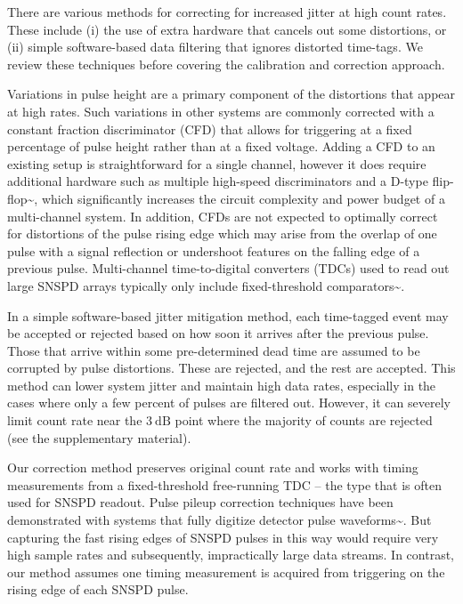 \documentclass[11pt]{caltech_thesis} %
\begin{document}
There are various methods for correcting for increased jitter at high
count rates. These include (i) the use of extra hardware that cancels
out some distortions, or (ii) simple software-based data filtering that
ignores distorted time-tags. We review these techniques before covering
the calibration and correction approach.

Variations in pulse height are a primary component of the distortions
that appear at high rates. Such variations in other systems are commonly
corrected with a constant fraction discriminator (CFD) that allows for
triggering at a fixed percentage of pulse height rather than at a fixed
voltage. Adding a CFD to an existing setup is straightforward for a
single channel, however it does require additional hardware such as
multiple high-speed discriminators and a D-type
flip-flop\textasciitilde{}\autocite{Becker2005}, which significantly
increases the circuit complexity and power budget of a multi-channel
system. In addition, CFDs are not expected to optimally correct for
distortions of the pulse rising edge which may arise from the overlap of
one pulse with a signal reflection or undershoot features on the falling
edge of a previous pulse. Multi-channel time-to-digital converters
(TDCs) used to read out large SNSPD arrays typically only include
fixed-threshold comparators\textasciitilde{}\autocite{Wollman2019}.

In a simple software-based jitter mitigation method, each time-tagged
event may be accepted or rejected based on how soon it arrives after the
previous pulse. Those that arrive within some pre-determined dead time
are assumed to be corrupted by pulse distortions. These are rejected,
and the rest are accepted. This method can lower system jitter and
maintain high data rates, especially in the cases where only a few
percent of pulses are filtered out. However, it can severely limit count
rate near the $3~\mathrm{dB}$ point where the majority of counts are
rejected (see the supplementary material).

Our correction method preserves original count rate and works with
timing measurements from a fixed-threshold free-running TDC -- the type
that is often used for SNSPD readout. Pulse pileup correction techniques
have been demonstrated with systems that fully digitize detector pulse
waveforms\textasciitilde{}\autocite{Behbahani2019,scoullar_evans_2009,Haselman2010}.
But capturing the fast rising edges of SNSPD pulses in this way would
require very high sample rates and subsequently, impractically large
data streams. In contrast, our method assumes one timing measurement is
acquired from triggering on the rising edge of each SNSPD pulse.
\end{document}
